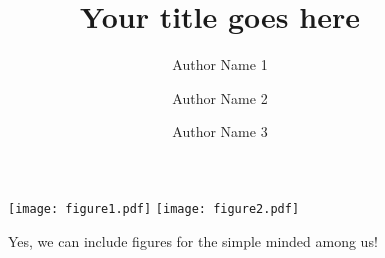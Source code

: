 \documentclass[a0,portrait]{a0poster}
\title{Your title goes here}
\author[1,*]{Author Name 1}
\author[2]{Author Name 2}
\author[2]{Author Name 3}
\affil[1]{Affiliation 1}
\affil[2]{Affiliation 2}
\affil[*]{\texttt{email@provider.com}}
\begin{document}
\makeheader

\begin{posterrow}{1}

\begin{posterbox}
\blindtext
\end{posterbox}

\end{posterrow}


\begin{posterrow}{2}

\begin{posterbox}

\begin{figure}
  \texttt{[image: figure1.pdf]}
  \hspace{2\baselineskip}
  \texttt{[image: figure2.pdf]}
  \caption{%
  Yes, we can include figures for the simple minded among us!
  }
\end{figure}

\begin{multicols}{2}
\blindtext
\end{multicols}
\end{posterbox}

\begin{posterbox}

\blindtext

\blindtext

\end{posterbox}

\end{posterrow}

\begin{posterrow}{3}

\begin{posterbox}[Wow!]
\blindtext
\end{posterbox}

\begin{posterbox}[Such]
\blindtext
\end{posterbox}

\begin{posterbox}[Boxes!]
\blindtext
\end{posterbox}

\end{posterrow}
\end{document}

